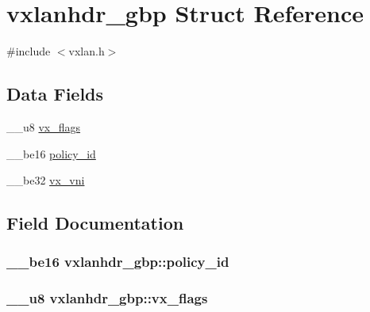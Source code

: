 \hypertarget{structvxlanhdr__gbp}{}\section{vxlanhdr\+\_\+gbp Struct Reference}
\label{structvxlanhdr__gbp}


{\ttfamily \#include $<$vxlan.\+h$>$}

\subsection*{Data Fields}
\begin{DoxyCompactItemize}
\item 
\+\_\+\+\_\+u8 \hyperlink{structvxlanhdr__gbp_a1d415b695ab8a201a5e2ec69301421b3}{vx\+\_\+flags}
\item 
\+\_\+\+\_\+be16 \hyperlink{structvxlanhdr__gbp_a96bf86ab13573ff42399f11b1c8c5e34}{policy\+\_\+id}
\item 
\+\_\+\+\_\+be32 \hyperlink{structvxlanhdr__gbp_aa6c706970acf2d5ffa86f76e7bad0b7a}{vx\+\_\+vni}
\end{DoxyCompactItemize}


\subsection{Field Documentation}
\hypertarget{structvxlanhdr__gbp_a96bf86ab13573ff42399f11b1c8c5e34}{}
\subsubsection[{policy\+\_\+id}]{\setlength{\rightskip}{0pt plus 5cm}\+\_\+\+\_\+be16 vxlanhdr\+\_\+gbp\+::policy\+\_\+id}\label{structvxlanhdr__gbp_a96bf86ab13573ff42399f11b1c8c5e34}
\hypertarget{structvxlanhdr__gbp_a1d415b695ab8a201a5e2ec69301421b3}{}
\subsubsection[{vx\+\_\+flags}]{\setlength{\rightskip}{0pt plus 5cm}\+\_\+\+\_\+u8 vxlanhdr\+\_\+gbp\+::vx\+\_\+flags}\label{structvxlanhdr__gbp_a1d415b695ab8a201a5e2ec69301421b3}
\hypertarget{structvxlanhdr__gbp_aa6c706970acf2d5ffa86f76e7bad0b7a}{}
